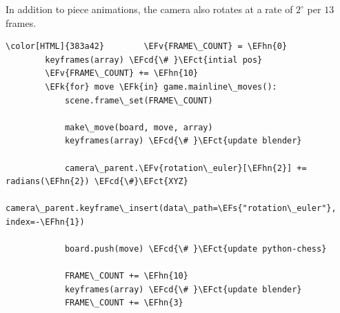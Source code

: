 \documentclass[11pt]{article}
\newcommand{\EFk}[1]{\textcolor{EFk}{#1}} %
\newcommand{\EFs}[1]{\textcolor{EFs}{#1}} %
\newcommand{\EFct}[1]{\textcolor{EFct}{#1}} %
\newcommand{\EFv}[1]{\textcolor{EFv}{#1}} %
\newcommand{\EFcd}[1]{\textcolor{EFcd}{#1}} %
\newcommand{\EFhn}[1]{\textcolor{EFhn}{\textbf{#1}}} %
\begin{document}
In addition to piece animations, the camera also rotates at a rate of
\(2^{\circ}\) per \(13\) frames.
\begin{Code}
\begin{Verbatim}[]
\color[HTML]{383a42}        \EFv{FRAME\_COUNT} = \EFhn{0}
        keyframes(array) \EFcd{\# }\EFct{intial pos}
        \EFv{FRAME\_COUNT} += \EFhn{10}
        \EFk{for} move \EFk{in} game.mainline\_moves():
            scene.frame\_set(FRAME\_COUNT)

            make\_move(board, move, array)
            keyframes(array) \EFcd{\# }\EFct{update blender}

            camera\_parent.\EFv{rotation\_euler}[\EFhn{2}] += radians(\EFhn{2}) \EFcd{\#}\EFct{XYZ}
            camera\_parent.keyframe\_insert(data\_path=\EFs{"rotation\_euler"}, index=-\EFhn{1})

            board.push(move) \EFcd{\# }\EFct{update python-chess}

            FRAME\_COUNT += \EFhn{10}
            keyframes(array) \EFcd{\# }\EFct{update blender}
            FRAME\_COUNT += \EFhn{3}
\end{Verbatim}
\end{Code}
\end{document}
